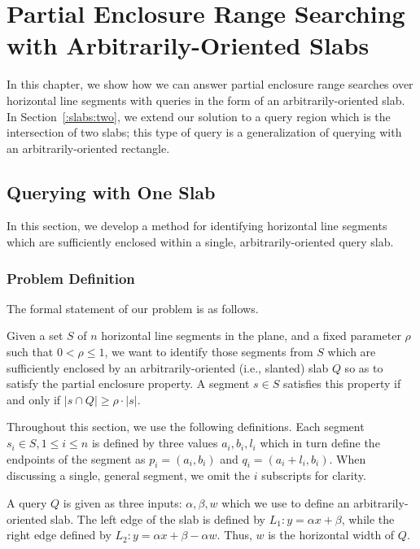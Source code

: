 \chapter{Partial Enclosure Range Searching with Arbitrarily-Oriented Slabs}
\label{:slabs}

In this chapter, we show how we can answer partial enclosure range searches over horizontal line segments with queries in the form of an arbitrarily-oriented slab.
In Section~\ref{:slabs:two}, we extend our solution to a query region which is the intersection of two slabs; this type of query is a generalization of querying with an arbitrarily-oriented rectangle.

\section{Querying with One Slab}
\label{:slabs:one}

In this section, we develop a method for identifying horizontal line segments which are sufficiently enclosed within a single, arbitrarily-oriented query slab.


\subsection{Problem Definition}
\label{:slabs:one:problem-definition}

The formal statement of our problem is as follows.

\begin{problem}
Given a set $S$ of $n$ horizontal line segments in the plane, and a fixed parameter $\rho$ such that $0 < \rho \leq 1$, we want to identify those segments from $S$ which are sufficiently enclosed by an arbitrarily-oriented (i.e., slanted) slab $Q$ so as to satisfy the partial enclosure property.
A segment $s \in S$ satisfies this property if and only if $|s \cap Q| \geq \rho \cdot |s|$.
\end{problem}

Throughout this section, we use the following definitions. Each segment $s_i \in S, 1 \leq i \leq n$ is defined by three values $a_i, b_i, l_i$ which in turn define the endpoints of the segment as $p_i = (a_i, b_i)$ and $q_i = (a_i + l_i, b_i)$. When discussing a single, general segment, we omit the $i$ subscripts for clarity.

A query $Q$ is given as three inputs: $\alpha, \beta, w$ which we use to define an arbitrarily-oriented slab.
The left edge of the slab is defined by $L_1 : y = \alpha x + \beta$, while the right edge defined by $L_2: y = \alpha x + \beta - \alpha w$. 
Thus, $w$ is the horizontal width of $Q$.

